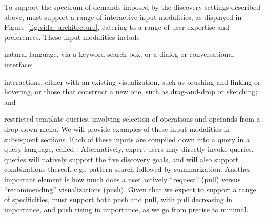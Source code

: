 


\par
{} To support the spectrum of 
demands imposed by the
discovery settings described above, \vida 
must support a range of interactive input modalities,
as displayed in Figure~\ref{fig:vida_architecture},
catering to a range of user expertise and preferences.
These input modalities include 
\squishlist
	\item natural language, via a keyword search box, or a dialog or conversational interface;
	\item interactions, either with an existing visualization, such as brushing-and-linking or hovering, or those that construct a new one, such as drag-and-drop or sketching; and
	\item restricted template queries, involving selection of operations and operands from a drop-down menu.
\squishend
We will provide examples of these input modalities in subsequent sections.
Each of these inputs are compiled down
into a query in a query language, called \vidaql.
Alternatively, expert users may directly invoke \vidaql queries.
\vidaql queries will natively support the five discovery goals,
and will also support combinations thereof, e.g., pattern search followed by 
summarization. 
Another important element is how much does a user actively ``request'' (pull)
versus \vida ``recommending'' visualizations (push). 
Given that we expect \vida to support a range of specificities,
\vida must support both push and pull, with pull decreasing
in importance, and push rising in importance, as we go from precise to minimal.

